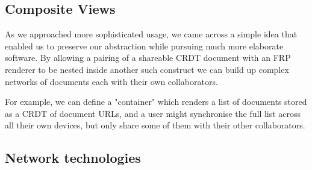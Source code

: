 \documentclass[sigplan,10pt]{acmart}
\begin{document}
\subsection{Composite Views}

As we approached more sophisticated usage, we came across a simple idea that enabled us to preserve our abstraction while pursuing much more elaborate software. By allowing a pairing of a shareable CRDT document with an FRP renderer to be nested inside another such construct we can build up complex networks of documents each with their own collaborators.

For example, we can define a "container" which renders a list of documents stored as a CRDT of document URLs, and a user might synchronise the full list across all their own devices, but only share some of them with their other collaborators.

\subsection{Network technologies}
\end{document}
